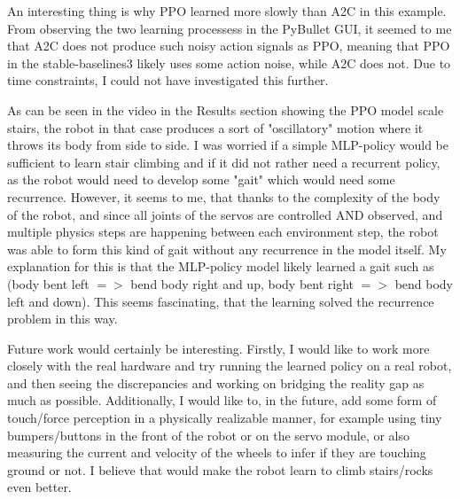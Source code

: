 \documentclass{article}
\begin{document}
An interesting thing is why PPO learned more slowly than A2C in this example.
From observing the two learning processess in the PyBullet GUI, it seemed to me that A2C does not produce such noisy action signals as PPO, meaning that PPO in the stable-baselines3 likely uses some action noise, while A2C does not.
Due to time constraints, I could not have investigated this further.

As can be seen in the video in the Results section showing the PPO model scale stairs, the robot in that case produces a sort of "oscillatory" motion where it throws its body from side to side.
I was worried if a simple MLP-policy would be sufficient to learn stair climbing and if it did not rather need a recurrent policy, as the robot would need to develop some "gait" which would need some recurrence.
However, it seems to me, that thanks to the complexity of the body of the robot, and since all joints of the servos are controlled AND observed, and multiple physics steps are happening between each environment step, the robot was able to form this kind of gait without any recurrence in the model itself.
My explanation for this is that the MLP-policy model likely learned a gait such as (body bent left $=>$ bend body right and up, body bent right $=>$ bend body left and down).
This seems fascinating, that the learning solved the recurrence problem in this way.

Future work would certainly be interesting.
Firstly, I would like to work more closely with the real hardware and try running the learned policy on a real robot, and then seeing the discrepancies and working on bridging the reality gap as much as possible. 
Additionally, I would like to, in the future, add some form of touch/force perception in a physically realizable manner, for example using tiny bumpers/buttons in the front of the robot or on the servo module, or also measuring the current and velocity of the wheels to infer if they are touching ground or not.
I believe that would make the robot learn to climb stairs/rocks even better.



% 

% 

\end{document}
